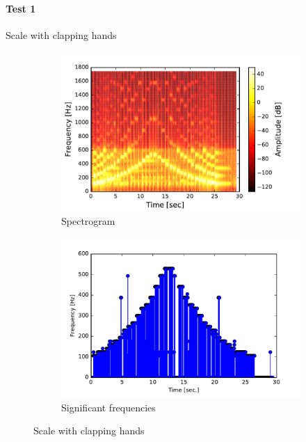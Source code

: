 \paragraph{Test 1} Scale with clapping hands
\begin{figure}[H]
\centering
\begin{subfigure}{0.49\textwidth}
\centering
\includegraphics[width=\textwidth]{figures/validation/systemtest/final_spec.pdf}
\caption{Spectrogram}
\label{fig:final_spec1}
\end{subfigure}
\begin{subfigure}{0.49\textwidth}
\centering
\includegraphics[width=\textwidth]{figures/validation/systemtest/final_peak.pdf}
\caption{Significant frequencies}
\label{fig:final_peak1}
\end{subfigure}
\caption{Scale with clapping hands}
\label{fig:final_1}
\end{figure} 


